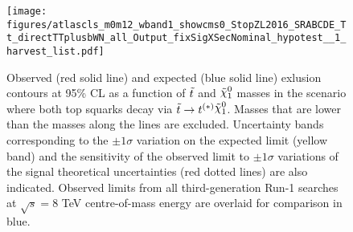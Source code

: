 \begin{figure}[htpb]
  \begin{center} \texttt{[image: figures/atlascls\_m0m12\_wband1\_showcms0\_StopZL2016\_SRABCDE\_Tt\_directTTplusbWN\_all\_Output\_fixSigXSecNominal\_hypotest\_\_1\_harvest\_list.pdf]}%
    \caption[Exclusion contours in as a function of $\stop$ and $\ninoone$ masses in the scenario where both top squarks decay via $\stop\to t^{(*)} \ninoone$]{Observed (red solid line) and expected (blue solid line)
      exlusion contours at 95\% CL as a function of $\stop$ and
      $\ninoone$ masses in the scenario where both top squarks decay
      via $\stop\to t^{(*)} \ninoone$. Masses that are lower than the masses along the lines are excluded. Uncertainty bands corresponding to the $\pm 1
      \sigma$ variation on the expected limit (yellow band) and the
      sensitivity of the observed limit to $\pm 1\sigma$ variations of
      the signal theoretical uncertainties (red dotted lines) are also
      indicated. Observed limits from all third-generation Run-1 searches~\cite{Atlas8TeVSummary} at $\sqrt{s}=8$ TeV centre-of-mass energy are overlaid for comparison in blue.}
    \label{fig:SRABC_exclusion}%
  \end{center}
\end{figure}








